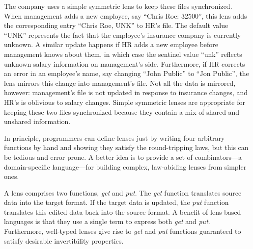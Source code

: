 \documentclass[12pt]{article}
\begin{document}
{The company uses a simple symmetric lens to keep these files
synchronized. When management adds a new employee, say ``Chris Roe: 32500'',
this lens 
adds the corresponding entry ``Chris Roe, UNK'' to HR's file. The default value
``UNK'' represents the fact that the employee's insurance company is currently
unknown. A similar update happens if HR adds a new employee before
management knows about them,
in which case the sentinel value ``unk'' reflects unknown salary information
on management's side.
Furthermore, if HR corrects an error in an employee's name, say changing ``John
Public'' to ``Jon Public'', the lens mirrors this change into management's
file. Not all the data is mirrored, however: management's file is not updated
in response to insurance changes, and HR's is oblivious to salary
changes. Simple symmetric lenses are appropriate for keeping these two files
synchronized because they contain a mix of shared and unshared information.

%

In principle, programmers can define lenses just by writing four arbitrary
functions by hand and showing they satisfy the round-tripping laws, but this
can be tedious and error prone.  A better idea is to provide a set of
combinators---a domain-specific language---for building complex, law-abiding
lenses from simpler ones. 

A lens comprises two functions,
\emph{get} and \emph{put}.  The \emph{get} function translates
source data into the target format.  If the target data is updated, the
\emph{put} function translates this edited data back into the
source format.  
A benefit of lens-based languages is that they use a single term
to express both 
\emph{get} and \emph{put}.
Furthermore, well-typed lenses give rise to 
\emph{get} and \emph{put} functions 
guaranteed to satisfy desirable invertibility properties.

}
\end{document}
